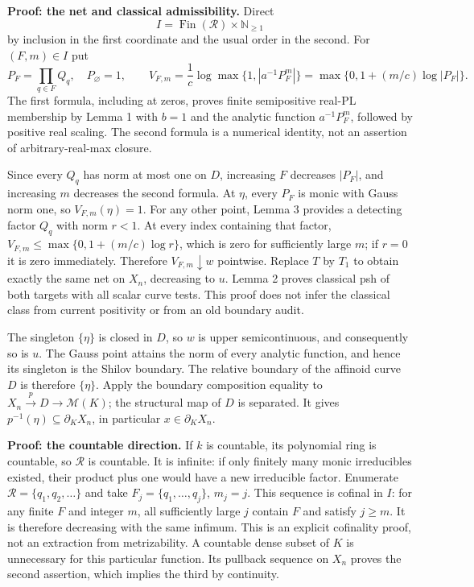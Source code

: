 \documentclass[
  11pt,
]{article}
\begin{document}
\textbf{Proof: the net and classical admissibility.} Direct
\[I=\operatorname{Fin}(\mathcal R)\times\mathbb N_{\ge1}\] by inclusion
in the first coordinate and the usual order in the second. For
\((F,m)\in I\) put \[P_F=\prod_{q\in F}Q_q,\quad P_\varnothing=1,\qquad
V_{F,m}=\frac1c\log\max\{1,|a^{-1}P_F^m|\}
=\max\{0,1+(m/c)\log|P_F|\}.\] The first formula, including at zeros,
proves finite semipositive real-PL membership by Lemma 1 with \(b=1\)
and the analytic function \(a^{-1}P_F^m\), followed by positive real
scaling. The second formula is a numerical identity, not an assertion of
arbitrary-real-max closure.

Since every \(Q_q\) has norm at most one on \(D\), increasing \(F\)
decreases \(|P_F|\), and increasing \(m\) decreases the second formula.
At \(\eta\), every \(P_F\) is monic with Gauss norm one, so
\(V_{F,m}(\eta)=1\). For any other point, Lemma 3 provides a detecting
factor \(Q_q\) with norm \(r<1\). At every index containing that factor,
\(V_{F,m}\le\max\{0,1+(m/c)\log r\}\), which is zero for sufficiently
large \(m\); if \(r=0\) it is zero immediately. Therefore
\(V_{F,m}\downarrow w\) pointwise. Replace \(T\) by \(T_1\) to obtain
exactly the same net on \(X_n\), decreasing to \(u\). Lemma 2 proves
classical psh of both targets with all scalar curve tests. This proof
does not infer the classical class from current positivity or from an
old boundary audit.

The singleton \(\{\eta\}\) is closed in \(D\), so \(w\) is upper
semicontinuous, and consequently so is \(u\). The Gauss point attains
the norm of every analytic function, and hence its singleton is the
Shilov boundary. The relative boundary of the affinoid curve \(D\) is
therefore \(\{\eta\}\). Apply the boundary composition equality to
\(X_n\xrightarrow p D\to\mathcal M(K)\); the structural map of \(D\) is
separated. It gives \(p^{-1}(\eta)\subseteq\partial_KX_n\), in
particular \(x\in\partial_KX_n\).

\textbf{Proof: the countable direction.} If \(k\) is countable, its
polynomial ring is countable, so \(\mathcal R\) is countable. It is
infinite: if only finitely many monic irreducibles existed, their
product plus one would have a new irreducible factor. Enumerate
\(\mathcal R=\{q_1,q_2,\ldots\}\) and take \(F_j=\{q_1,\ldots,q_j\}\),
\(m_j=j\). This sequence is cofinal in \(I\): for any finite \(F\) and
integer \(m\), all sufficiently large \(j\) contain \(F\) and satisfy
\(j\ge m\). It is therefore decreasing with the same infimum. This is an
explicit cofinality proof, not an extraction from metrizability. A
countable dense subset of \(K\) is unnecessary for this particular
function. Its pullback sequence on \(X_n\) proves the second assertion,
which implies the third by continuity.
\end{document}
